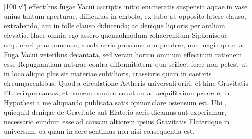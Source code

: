 [100 v\textsuperscript{o}]  effectibus fugae Vacui\protect{} ascriptis initio enumeratis suspensio aquae in vase unius tantum aperturae, difficultas in embolo\protect{}, ex tubo ab opposito latere clauso, extrahendo, aut in folle clauso diducendo; ac denique liquoris per antliam\protect{} elevatio. Haec omnia ego assero quemadmodum  cohaerentium Siphonisque\protect{} aequicruri phaenomenon,  a sola aeris pressione\protect{} non pendere, non magis quam a Fuga Vacui\protect{} veteribus decantata, sed veram horum omnium effectuum rationem esse Repugnantiam naturae contra difformitatem, qua scilicet ferre  non potest ut in loco aliquo plus sit materiae subtilioris\protect{},  crassioris quam in caeteris circumjacentibus. Quod a circulatione Aetheris\protect{} universali\protect{}  oriri, et hinc Gravitatis\protect{} Elateriique\protect{} causas, et omnem omnino conatum\protect{} ad aequilibrium\protect{} pendere, in Hypothesi a me aliquando publicata satis opinor clare ostensum est. Ubi , quicquid denique de Gravitate\protect{} aut Elaterio\protect{} aeris dicamus aut experiamur, necessario eundum esse ad causam altiorem ipsius Gravitatis\protect{} Elateriique\protect{} in universum\protect{},  ea quam in aere sentimus non nisi consequentia est.\pend 
